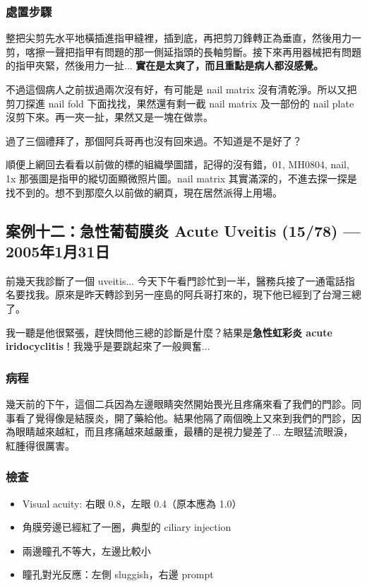 \documentclass[12pt,a4paper]{article}
\newenvironment{myquote}{%
    \begin{tcolorbox}[
        colback=quote_bg,
        colframe=emergency_gray,
        boxrule=0pt,
        leftrule=3pt,
        arc=0pt,
        left=10pt,
        right=10pt,
        top=8pt,
        bottom=8pt
    ]
    \itshape
}{%
    \end{tcolorbox}
}
\begin{document}
\subsubsection{處置步驟}

整把尖剪先水平地橫插進指甲縫裡，插到底，再把剪刀鋒轉正為垂直，然後用力一剪，喀擦一聲把指甲有問題的那一側延指頭的長軸剪斷。接下來再用器械把有問題的指甲夾緊，然後用力一扯... \textbf{實在是太爽了，而且重點是病人都沒感覺。}

不過這個病人之前拔過兩次沒有好，有可能是 nail matrix 沒有清乾淨。所以又把剪刀探進 nail fold 下面找找，果然還有剩一截 nail matrix 及一部份的 nail plate 沒剪下來。再一夾一扯，果然又是一塊在做祟。

過了三個禮拜了，那個阿兵哥再也沒有回來過。不知道是不是好了？

\begin{myquote}
順便上網回去看看以前做的標的組織學圖譜，記得的沒有錯，01, MH0804, nail, 1x 那張圖是指甲的縱切面顯微照片圖。nail matrix 其實滿深的，不進去探一探是找不到的。想不到那麼久以前做的網頁，現在居然派得上用場。
\end{myquote}

\subsection{案例十二：急性葡萄膜炎 Acute Uveitis (15/78) — 2005年1月31日}

前幾天我診斷了一個 uveitis... 今天下午看門診忙到一半，醫務兵接了一通電話指名要找我。原來是昨天轉診到另一座島的阿兵哥打來的，現下他已經到了台灣三總了。

我一聽是他很緊張，趕快問他三總的診斷是什麼？結果是\textbf{急性虹彩炎 acute iridocyclitis}！我幾乎是要跳起來了一般興奮...

\subsubsection{病程}

幾天前的下午，這個二兵因為左邊眼睛突然開始畏光且疼痛來看了我們的門診。同事看了覺得像是結膜炎，開了藥給他。結果他隔了兩個晚上又來到我們的門診，因為眼睛越來越紅，而且疼痛越來越嚴重，最糟的是視力變差了... 左眼猛流眼淚，紅腫得很厲害。

\subsubsection{檢查}

\begin{itemize}
    \item Visual acuity: 右眼 0.8，左眼 0.4（原本應為 1.0）
    \item 角膜旁邊已經紅了一圈，典型的 ciliary injection
    \item 兩邊瞳孔不等大，左邊比較小
    \item 瞳孔對光反應：左側 sluggish，右邊 prompt
\end{itemize}
\end{document}

